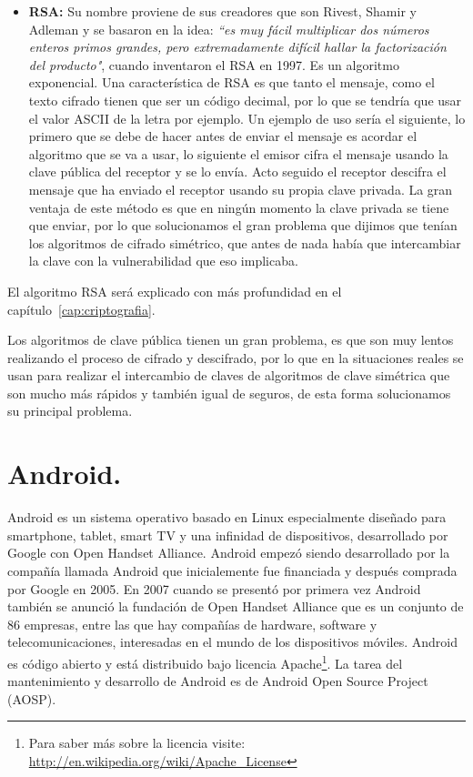 \begin{itemize}

	\item \textbf{RSA:} Su nombre proviene de sus creadores que son Rivest, Shamir y Adleman y se basaron en la idea: \textit{``es muy fácil multiplicar dos números enteros primos grandes, pero extremadamente difícil hallar la factorización del producto"}, cuando inventaron el RSA en 1997. Es un algoritmo exponencial. Una característica de RSA es que tanto el mensaje, como el texto cifrado tienen que ser un código decimal, por lo que se tendría que usar el valor ASCII de la letra por ejemplo. Un ejemplo de uso sería el siguiente, lo primero que se debe de hacer antes de enviar el mensaje es acordar el algoritmo que se va a usar, lo siguiente el emisor cifra el mensaje usando la clave pública del receptor y se lo envía. Acto seguido el receptor descifra el mensaje que ha enviado el receptor usando su propia clave privada. La gran ventaja de este método es que en ningún momento la clave privada se tiene que enviar, por lo que solucionamos el gran problema que dijimos que tenían los algoritmos de cifrado simétrico, que antes de nada había que intercambiar la clave con la vulnerabilidad que eso implicaba. 

\end{itemize}

El algoritmo RSA será explicado con más profundidad en el capítulo~\ref{cap:criptografia}.

Los algoritmos de clave pública tienen un gran problema, es que son muy lentos realizando el proceso de cifrado y descifrado, por lo que en la situaciones reales se usan para realizar el intercambio de claves de algoritmos de clave simétrica que son mucho más rápidos y también igual de seguros, de esta forma solucionamos su principal problema.

\section{Android.}

Android es un sistema operativo basado en Linux especialmente diseñado para smartphone, tablet, smart TV y una infinidad de dispositivos, desarrollado por Google con Open Handset Alliance. Android empezó siendo desarrollado por la compañía llamada Android que inicialemente fue financiada y después comprada por Google en 2005. En 2007 cuando se presentó por primera vez Android también se anunció la fundación de Open Handset Alliance que es un conjunto de 86 empresas, entre las que hay compañías de hardware, software y telecomunicaciones, interesadas en el mundo de los dispositivos móviles. Android es código abierto y está distribuido bajo licencia Apache\footnote{Para saber más sobre la licencia visite: \url{http://en.wikipedia.org/wiki/Apache\_License}}. La tarea del mantenimiento y desarrollo de Android es de Android Open Source Project (AOSP).

